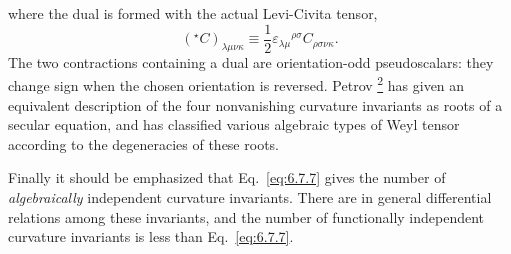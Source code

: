 where the dual is formed with the actual Levi-Civita tensor,
\[
  ({}^\star C)_{\lambda\mu\nu\kappa}
  \equiv
  \frac12\varepsilon_{\lambda\mu}{}^{\rho\sigma}
  C_{\rho\sigma\nu\kappa}.
\]
The two contractions containing a dual are orientation-odd pseudoscalars:
they change sign when the chosen orientation is reversed. Petrov
\hyperref[ch6-ref-2]{\textsuperscript{2}} has given an equivalent description
of the four nonvanishing curvature invariants as roots of a secular equation,
and has classified various algebraic types of Weyl tensor according to the
degeneracies of these roots.

Finally it should be emphasized that Eq.~\eqref{eq:6.7.7} gives the number of
\emph{algebraically} independent curvature invariants. There are in general
differential relations among these invariants, and the number of functionally
independent curvature invariants is less than Eq.~\eqref{eq:6.7.7}.
